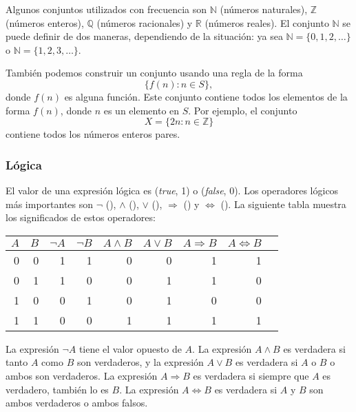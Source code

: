 Algunos conjuntos utilizados con frecuencia son
$\mathbb{N}$ (números naturales),
$\mathbb{Z}$ (números enteros),
$\mathbb{Q}$ (números racionales) y
$\mathbb{R}$ (números reales).
El conjunto $\mathbb{N}$
se puede definir de dos maneras, dependiendo
de la situación:
ya sea $\mathbb{N}=\{0,1,2,\ldots\}$
o $\mathbb{N}=\{1,2,3,\ldots\}$.

También podemos construir un conjunto usando una regla de la forma
\[\{f(n) : n \in S\},\]
donde $f(n)$ es alguna función.
Este conjunto contiene todos los elementos de la forma $f(n)$,
donde $n$ es un elemento en $S$.
Por ejemplo, el conjunto
\[X=\{2n : n \in \mathbb{Z}\}\]
contiene todos los números enteros pares.

\subsubsection{Lógica}


El valor de una expresión lógica es
 (\textit{true}, 1) o  (\textit{false}, 0).
Los operadores lógicos más importantes son
$\lnot$ (),
$\land$ (),
$\lor$ (),
$\Rightarrow$ () y
$\Leftrightarrow$ ().
La siguiente tabla muestra los significados de estos operadores:

\begin{center}
\begin{tabular}{rr|rrrrrrr}
$A$ & $B$ & $\lnot A$ & $\lnot B$ & $A \land B$ & $A \lor B$ & $A \Rightarrow B$ & $A \Leftrightarrow B$ \\
\hline
0 & 0 & 1 & 1 & 0 & 0 & 1 & 1 \\
0 & 1 & 1 & 0 & 0 & 1 & 1 & 0 \\
1 & 0 & 0 & 1 & 0 & 1 & 0 & 0 \\
1 & 1 & 0 & 0 & 1 & 1 & 1 & 1 \\
\end{tabular}
\end{center}

La expresión $\lnot A$ tiene el valor opuesto de $A$.
La expresión $A \land B$ es verdadera si tanto $A$ como $B$
son verdaderos,
y la expresión $A \lor B$ es verdadera si $A$ o $B$ o ambos
son verdaderos.
La expresión $A \Rightarrow B$ es verdadera
si siempre que $A$ es verdadero, también lo es $B$.
La expresión $A \Leftrightarrow B$ es verdadera
si $A$ y $B$ son ambos verdaderos o ambos falsos.

